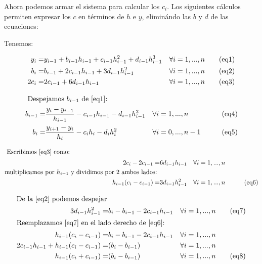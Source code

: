
\par Ahora podemos armar el sistema para calcular los $c_i$. Los siguientes cálculos permiten expresar los $c$ en términos de $h$ e $y$, eliminándo las $b$ y $d$ de las ecuaciones:

\par Tenemos:

\begin{align}
\setcounter{equation}{0}
y_i =& y_{i-1} + b_{i-1}h_{i-1} + c_{i-1}h_{i-1}^2 +  d_{i-1}h_{i-1}^3  & \forall i= 1, ..., n \tag{eq1} \label{eq1}\\
b_i =& b_{i-1} + 2c_{i-1}h_{i-1} + 3d_{i-1}h_{i-1}^2 & \forall i= 1, ..., n  \tag{eq2} \label{eq2}\\
2c_i =& 2c_{i-1} + 6d_{i-1}h_{i-1}  & \forall i= 1, ..., n \tag{eq3} \label{eq3}
\end{align}


\begin{align*}
\intertext{ Despejamos $b_{i-1}$ de \eqref{eq1}: } 
b_{i-1} = &  \frac{y_i-y_{i-1}}{h_{i-1}} - c_{i-1}h_{i-1} - d_{i-1}h_{i-1}^2  & & \forall i= 1, ..., n & \tag{eq4} \label{eq4} \\
b_{i} = &  \frac{y_{i+1}-y_{i}}{h_{i}} - c_{i}h_{i} - d_{i}h_{i}^2  & & \forall i= 0, ..., n-1 & \tag{eq5} \label{eq5} \\
\end{align*}

\begin{align*}
\intertext{ Escribimos \eqref{eq3} como: } 
2c_i-2c_{i-1} = & 6d_{i-1}h_{i-1}		  & & \forall i= 1, ..., n \\
\text{multiplicamos por } h_{i-1} \text{ y dividimos por 2 ambos lados: } \\
h_{i-1}(c_i-c_{i-1}) = & 3d_{i-1}h_{i-1}^2 		 & & \forall i= 1, ..., n  & \tag{eq6} \label{eq6} \\
\end{align*}

\begin{align*}
\intertext{De la \eqref{eq2} podemos despejar } 
3d_{i-1}h_{i-1}^2 = & b_i - b_{i-1} - 2c_{i-1}h_{i-1} & & \forall i= 1, ..., n  \tag{eq7} \label{eq7} \\
\intertext{Reemplazamos \eqref{eq7} en el lado derecho de \eqref{eq6}: } 
h_{i-1}(c_i-c_{i-1}) = & b_i - b_{i-1} - 2c_{i-1}h_{i-1} & & \forall i= 1, ..., n \\
2c_{i-1}h_{i-1} + h_{i-1}(c_i-c_{i-1}) = & (b_i-b_{i-1}) & & \forall i= 1, ..., n \\
h_{i-1}(c_i+c_{i-1}) = & (b_i-b_{i-1}) & & \forall i= 1, ..., n \tag{eq8} \label{eq8}
\end{align*}

